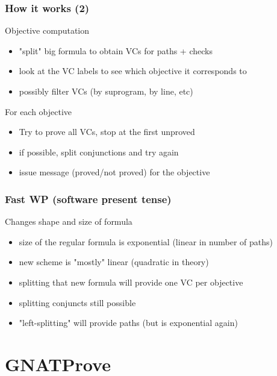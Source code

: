 \documentclass{beamer}
\newenvironment{specialframe}{%
  \begin{frame}[fragile,environment=specialframe]}{\end{frame}}
\begin{document}
\begin{specialframe}\frametitle{How it works (2)}

   \begin{block}{Objective computation}
      \begin{itemize}
         \item "split" big formula to obtain VCs for paths + checks
         \item look at the VC labels to see which objective it corresponds to
         \item possibly filter VCs (by suprogram, by line, etc)
      \end{itemize}
   \end{block}
   \begin{block}{For each objective}
      \begin{itemize}
         \item Try to prove all VCs, stop at the first unproved
         \item if possible, split conjunctions and try again
         \item issue message (proved/not proved) for the objective
      \end{itemize}
   \end{block}

\end{specialframe}

\begin{specialframe}\frametitle{Fast WP (software present tense)}

   \begin{block}{Changes shape and size of formula}
      \begin{itemize}
      \item size of the regular formula is exponential (linear in number of paths)
      \item new scheme is "mostly" linear (quadratic in theory)
      \item splitting that new formula will provide one VC per objective
      \item splitting conjuncts still possible
      \item "left-splitting" will provide paths (but is exponential again)
      \end{itemize}
   \end{block}

\end{specialframe}

\section{GNATProve}
\end{document}
